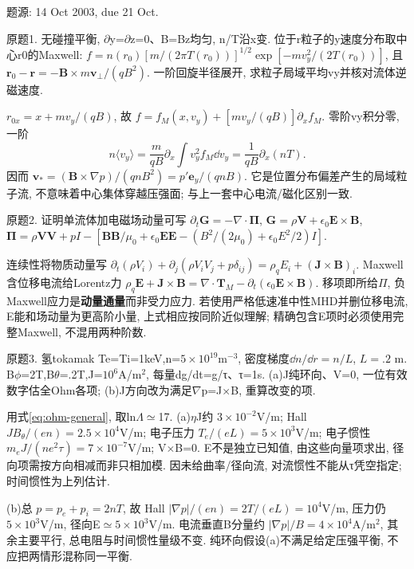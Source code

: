 题源: 14 Oct 2003, due 21 Oct.
\begin{exercise}\label{ex:03-5-1}
原题1. 无碰撞平衡, \ensuremath{\partial}y=\ensuremath{\partial}z=0、B=Bz均匀, n/T沿x变. 位于r粒子的y速度分布取中心r0的Maxwell: $f=n(r_0)[m/(2\pi T(r_0))]^{1/2}\exp[-mv_y^2/(2T(r_0))]$, 且 $\mathbf r_0-\mathbf r=-\mathbf B\times m\mathbf v_\perp/(qB^2)$. 一阶回旋半径展开, 求粒子局域平均vy并核对流体逆磁速度.
\end{exercise}
\begin{solution}
$r_{0x}=x+mv_y/(qB)$, 故 $f=f_M(x,v_y)+[mv_y/(qB)]\partial_xf_M$. 零阶vy积分零, 一阶 \begin{equation}n\langle v_y\rangle=\frac m{qB}\partial_x\int v_y^2 f_M\dd v_y=\frac1{qB}\partial_x(nT).\end{equation} 因而 $\mathbf v_*=(\mathbf B\times\nabla p)/(qnB^2)=p'\mathbf e_y/(qnB)$. 它是位置分布偏差产生的局域粒子流, 不意味着中心集体穿越压强面; 与上一套中心电流/磁化区别一致.
\end{solution}
\begin{exercise}\label{ex:03-5-2}
原题2. 证明单流体加电磁场动量可写 $\partial_t\mathbf G=-\nabla\cdot\boldsymbol\Pi$, $\mathbf G=\rho\mathbf V+\epsilon_0\mathbf E\times\mathbf B$, $\boldsymbol\Pi=\rho\mathbf V\mathbf V+pI-[\mathbf B\mathbf B/\mu_0+\epsilon_0\mathbf E\mathbf E-(B^2/(2\mu_0)+\epsilon_0E^2/2)I]$.
\end{exercise}
\begin{solution}
连续性将物质动量写 $\partial_t(\rho V_i)+\partial_j(\rho V_iV_j+p\delta_{ij})=\rho_qE_i+(\mathbf J\times\mathbf B)_i$. Maxwell含位移电流给Lorentz力 $\rho_q\mathbf E+\mathbf J\times\mathbf B=\nabla\cdot\mathbf T_M-\partial_t(\epsilon_0\mathbf E\times\mathbf B)$. 移项即所给\ensuremath{\Pi}, 负Maxwell应力是\textbf{动量通量}而非受力应力. 若使用严格低速准中性MHD并删位移电流, E能和场动量为更高阶小量, 上式相应按同阶近似理解; 精确包含E项时必须使用完整Maxwell, 不混用两种阶数.
\end{solution}
\begin{exercise}\label{ex:03-5-3}
原题3. 氢tokamak Te=Ti=1keV,n=$5\times10^{19}$m$^{-3}$, 密度梯度$\dd n/\dd r=n/L$, $L=.2$ m.
 B\ensuremath{\phi}=2T,B\ensuremath{\theta}=.2T,J=$10^6$A/m\ensuremath{{}^{2}}, 每量dg/dt=g/τ、τ=1s. (a)J纯环向、V=0, 一位有效数字估全Ohm各项; (b)J方向改为满足\ensuremath{\nabla}p=J\ensuremath{\times}B, 重算改变的项.
\end{exercise}
\begin{solution}
用式\eqref{eq:ohm-general}, 取ln\ensuremath{\Lambda}\ensuremath{\simeq}17. (a)\ensuremath{\eta}J约 $3\times10^{-2}$V/m; Hall $JB_\theta/(en)=2.5\times10^4$V/m; 电子压力 $T_e/(eL)=5\times10^3$V/m; 电子惯性 $m_eJ/(ne^2\tau)=7\times10^{-7}$V/m; V\ensuremath{\times}B=0. E不是独立已知值, 由这些向量项求出, 径向项需按方向相减而非只相加模. 因未给曲率/径向流, 对流惯性不能从τ凭空指定; 时间惯性为上列估计.

(b)总 $p=p_e+p_i=2nT$, 故 Hall $|\nabla p|/(en)=2T/(eL)=10^4$V/m, 压力仍 $5\times10^3$V/m, 径向E\ensuremath{\simeq}$5\times10^3$V/m. 电流垂直B分量约 $|\nabla p|/B=4\times10^4$A/m\ensuremath{{}^{2}}, 其余主要平行, 总电阻与时间惯性量级不变. 纯环向假设(a)不满足给定压强平衡, 不应把两情形混称同一平衡.
\end{solution}
